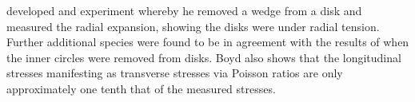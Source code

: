 \cite{boyd1950tree} developed and experiment whereby he removed a wedge from a disk
and measured the radial expansion, showing the disks were under radial
tension. Further additional species were found to be in agreement with the
results of \cite{jacobs1945l} when the inner circles were removed from disks. Boyd also shows
that the longitudinal stresses manifesting as transverse stresses via Poisson
ratios are only approximately one tenth that of the measured stresses.